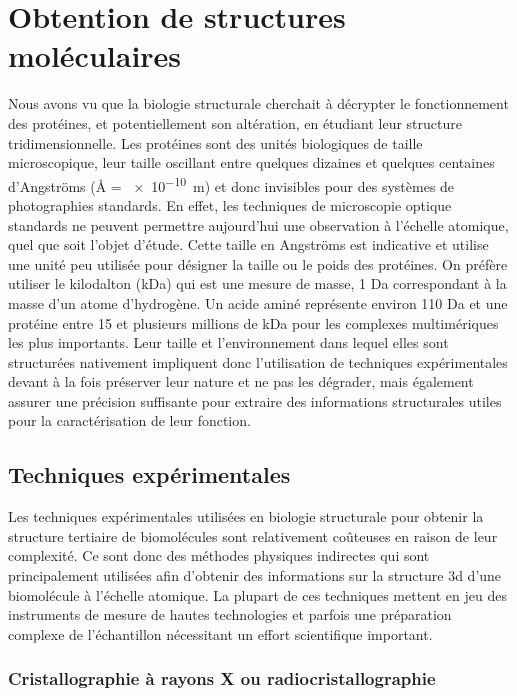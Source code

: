 \section{Obtention de structures moléculaires}

Nous avons vu que la biologie structurale cherchait à décrypter le fonctionnement des protéines, et potentiellement son altération, en étudiant leur structure tridimensionnelle. Les protéines sont des unités biologiques de taille microscopique, leur taille oscillant entre quelques dizaines et quelques centaines d'Angströms (\r{A} = \SI{e-10}{\metre}) et donc invisibles pour des systèmes de photographies standards. En effet, les techniques de microscopie optique standards ne peuvent permettre aujourd'hui une observation à l'échelle atomique, quel que soit l'objet d'étude. Cette taille en Angströms est indicative et utilise une unité peu utilisée pour désigner la taille ou le poids des protéines. On préfère utiliser le kilodalton (kDa) qui est une mesure de masse, 1 Da correspondant à la masse d'un atome d'hydrogène. Un acide aminé représente environ 110 Da et une protéine entre 15 et plusieurs millions de kDa pour les complexes multimériques les plus importants. Leur taille et l'environnement dans lequel elles sont structurées nativement impliquent donc l'utilisation de techniques expérimentales devant à la fois préserver leur nature et ne pas les dégrader, mais également assurer une précision suffisante pour extraire des informations structurales utiles pour la caractérisation de leur fonction.

\subsection{Techniques expérimentales}

Les techniques expérimentales utilisées en biologie structurale pour obtenir la structure tertiaire de biomolécules sont relativement coûteuses en raison de leur complexité. Ce sont donc des méthodes physiques indirectes qui sont principalement utilisées afin d'obtenir des informations sur la structure 3d d'une biomolécule à l'échelle atomique. La plupart de ces techniques mettent en jeu des instruments de mesure de hautes technologies et parfois une préparation complexe de l'échantillon nécessitant un effort scientifique important.

\subsubsection{Cristallographie à rayons X ou radiocristallographie}

